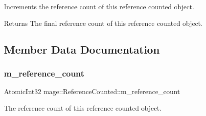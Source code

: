 Increments the reference count of this reference counted object.

\begin{DoxyReturn}{Returns}
The final reference count of this reference counted object. 
\end{DoxyReturn}


\subsection{Member Data Documentation}
\hypertarget{classmage_1_1_reference_counted_a8ff45f2437be26148d0efcd271adaf45}{}\label{classmage_1_1_reference_counted_a8ff45f2437be26148d0efcd271adaf45} 
\subsubsection{\texorpdfstring{m\+\_\+reference\+\_\+count}{m\_reference\_count}}
{\footnotesize\ttfamily Atomic\+Int32 mage\+::\+Reference\+Counted\+::m\+\_\+reference\+\_\+count\hspace{0.3cm}{\ttfamily [private]}}

The reference count of this reference counted object. 